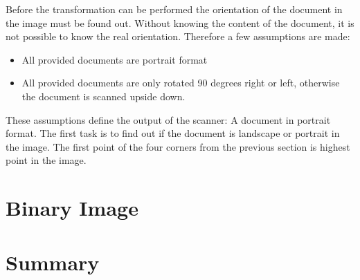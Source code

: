 \documentclass[twocolumn,10pt]{asme2ej}
\begin{document}
Before the transformation can be performed the orientation of the document in the image must be found out.
Without knowing the content of the document, it is not possible to know the real orientation. Therefore a few assumptions are made:
\begin{itemize}
    \item All provided documents are portrait format
    \item All provided documents are only rotated 90 degrees right or left, otherwise the document is scanned upside down.
\end{itemize}
These assumptions define the output of the scanner: A document in portrait format.
The first task is to find out if the document is landscape or portrait in the image.
The first point of the four corners from the previous section is highest point in the image.





\section{Binary Image}


\section{Summary}

















\end{document}
